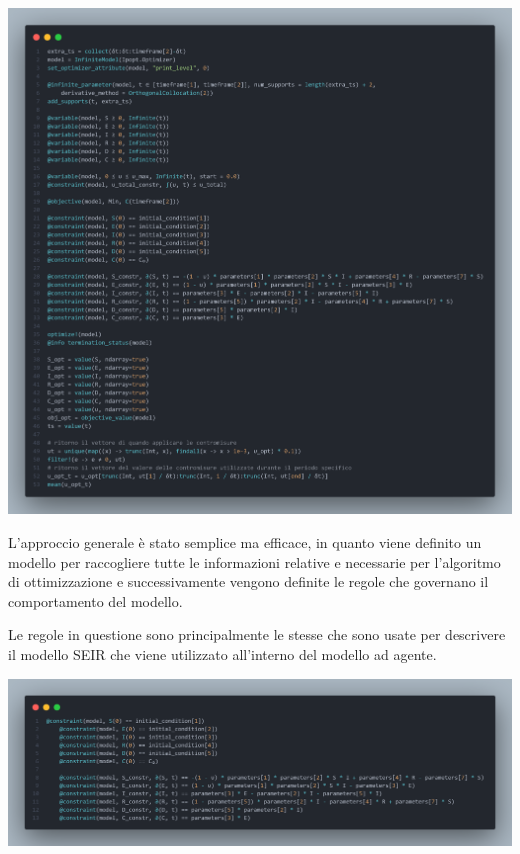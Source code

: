 \begin{minipage}{\linewidth}
	\centering
	\includegraphics[width=\textwidth]{img/controller_ipopt.png}
	\label{fig:controller_ipopt}
\end{minipage}

L'approccio generale è stato semplice ma efficace, in quanto viene definito un modello 
per raccogliere tutte le informazioni relative e necessarie per l'algoritmo di ottimizzazione
e successivamente vengono definite le regole che governano il comportamento del modello. 

Le regole in questione sono principalmente le stesse che sono usate per descrivere il modello SEIR
che viene utilizzato all'interno del modello ad agente.

\begin{minipage}{\linewidth}
	\centering
	\includegraphics[width=\textwidth]{img/controller_rules.png}
	\label{fig:controller_rules}
\end{minipage}

